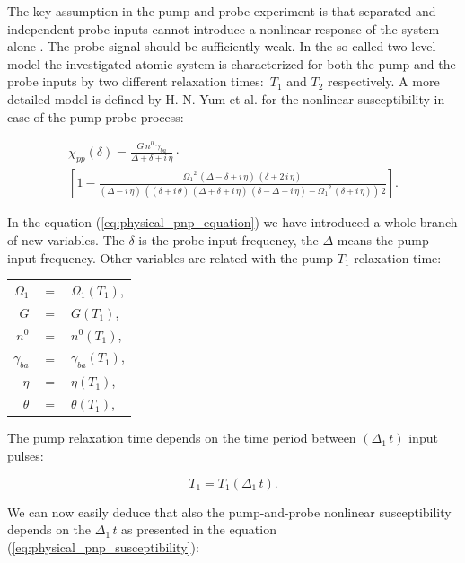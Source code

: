 \documentclass[12pt,twoside,a4paper]{article}
\numberwithin{equation}{subsection}
\numberwithin{figure}{subsection}
\begin{document}
The key assumption in the pump-and-probe experiment is that separated and independent probe inputs cannot introduce a nonlinear
response of the system alone \cite{boyd_nlo}. The probe signal should be sufficiently weak. In the so-called two-level model the
investigated atomic system is characterized for both the pump and the probe inputs by two different relaxation times:~${T_{1}}$ 
and ${T_{2}}$ respectively. A more detailed model is defined by H. N. Yum et al. \cite{yum_pump} for the nonlinear susceptibility in
case of the pump-probe process:

\begin{multline}   \label{eq:physical_pnp_equation}
     \chi_{pp} (\delta ) = \frac {G\,n^{0}\,{\gamma_{ba}}}{\Delta  + \delta  + i\,\eta } \cdot \\
     [1 - \frac {{\Omega_{1}}^{2}\,(\Delta  - \delta  + i\,\eta )\,(\delta  + 2\,i\,\eta )}{(\Delta  - i\,\eta )\,((\delta  + i\,
     \theta)\,(\Delta  + \delta  + i\,\eta )\,(\delta  - \Delta  + i\,\eta ) - {\Omega_{1}}^{2}\,(\delta  + i\,\eta ))\,2}].
\end{multline}

In the equation (\ref{eq:physical_pnp_equation}) we have introduced a whole branch of new variables. The $\delta $ is the probe
input frequency, the $\Delta $ means the pump input frequency. Other variables are related with the pump $ T_{1} $ relaxation time:

\begin{tabular} {r c l}
	$ \Omega_{1} $  & $ = $ & $ \Omega_{1} ( T_{1} )$, \\
	$ G $           & $ = $ & $  G ( T_{1} )$, \\
	$ n^{0} $       & $ = $ & $  n^{0} ( T_{1} )$, \\
	$ \gamma_{ba} $ & $ = $ & $  \gamma_{ba} ( T_{1} )$, \\
	$ \eta $        & $ = $ & $  \eta ( T_{1} )$, \\
	$ \theta $      & $ = $ & $  \theta ( T_{1} )$, \\
\end{tabular}

The pump relaxation time depends on the time period between $( \Delta_1 \, t)$ input pulses:

\begin{equation} \label{eq:physical_periodtime}
   T_{1} =  T_{1} ( \Delta_1 \, t).
\end{equation}

We can now easily deduce that also the pump-and-probe nonlinear susceptibility depends on the $\Delta_1 \, t $ as presented in the equation
(\ref{eq:physical_pnp_susceptibility}):
\end{document}
